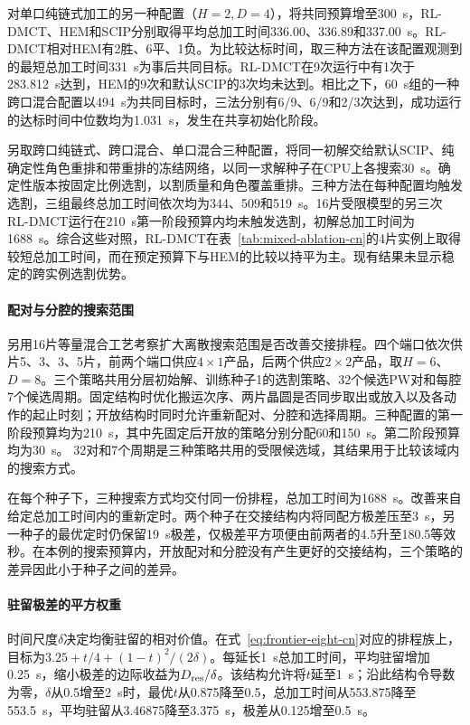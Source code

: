 \documentclass[preprint,12pt,nonatbib]{elsarticle}
\begin{document}
对单口纯链式加工的另一种配置（$H=2,D=4$），将共同预算增至300~s，RL-DMCT、HEM和SCIP分别取得平均总加工时间336.00、336.89和337.00~s。RL-DMCT相对HEM有2胜、6平、1负。为比较达标时间，取三种方法在该配置观测到的最短总加工时间331~s为事后共同目标。RL-DMCT在9次运行中有1次于283.812~s达到，HEM的9次和默认SCIP的3次均未达到。相比之下，60~s组的一种跨口混合配置以494~s为共同目标时，三法分别有6/9、6/9和2/3次达到，成功运行的达标时间中位数均为1.031~s，发生在共享初始化阶段。

另取跨口纯链式、跨口混合、单口混合三种配置，将同一初解交给默认SCIP、纯确定性角色重排和带重排的冻结网络，以同一求解种子在CPU上各搜索30~s。确定性版本按固定比例选割，以割质量和角色覆盖重排。三种方法在每种配置均触发选割，三组最终总加工时间依次均为344、509和519~s。16片受限模型的另三次RL-DMCT运行在210~s第一阶段预算内均未触发选割，初解总加工时间为1688~s。综合这些对照，RL-DMCT在表~\ref{tab:mixed-ablation-cn}的4片实例上取得较短总加工时间，而在预定预算下与HEM的比较以持平为主。现有结果未显示稳定的跨实例选割优势。

\paragraph{配对与分腔的搜索范围}
另用16片等量混合工艺考察扩大离散搜索范围是否改善交接排程。四个端口依次供片5、3、3、5片，前两个端口供应$4\times1$产品，后两个供应$2\times2$产品，取$H=6$、$D=8$。三个策略共用分层初始解、训练种子1的选割策略、32个候选PW对和每腔7个候选周期。固定结构时优化搬运次序、两片晶圆是否同步取出或放入以及各动作的起止时刻；开放结构时同时允许重新配对、分腔和选择周期。三种配置的第一阶段预算均为210~s，其中先固定后开放的策略分别分配60和150~s。第二阶段预算均为30~s。 32对和7个周期是三种策略共用的受限候选域，其结果用于比较该域内的搜索方式。

在每个种子下，三种搜索方式均交付同一份排程，总加工时间为1688~s。改善来自给定总加工时间内的重新定时。两个种子在交接结构内将同配方极差压至3~s，另一种子的最优定时仍保留19~s极差，仅极差平方项便由前两者的4.5升至180.5等效秒。在本例的搜索预算内，开放配对和分腔没有产生更好的交接结构，三个策略的差异因此小于种子之间的差异。

\paragraph{驻留极差的平方权重}
时间尺度$\delta$决定均衡驻留的相对价值。在式~\eqref{eq:frontier-eight-cn}对应的排程族上，目标为$3.25+t/4+(1-t)^2/(2\delta)$。每延长1~s总加工时间，平均驻留增加0.25~s，缩小极差的边际收益为$D_{\rm res}/\delta$。该结构允许将$t$延至1~s；沿此结构令导数为零，$\delta$从0.5增至2~s时，最优$t$从0.875降至0.5，总加工时间从553.875降至553.5~s，平均驻留从3.46875降至3.375~s，极差从0.125增至0.5~s。
\end{document}
